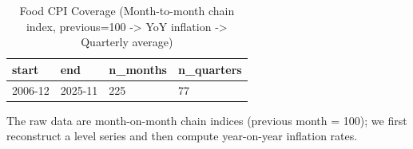 \begin{table}[!htbp]
    \centering
    \small
    \caption{Food CPI Coverage (Month-to-month chain index, previous=100 -> YoY inflation -> Quarterly average)}
    \label{tab:food_cpi_coverage}
    \begin{threeparttable}
        \begin{tabular}{@{}llll@{}}
            \toprule
            start   & end     & n_months & n_quarters \\
            \midrule
            2006-12 & 2025-11 & 225      & 77         \\
            \bottomrule
        \end{tabular}
        \begin{tablenotes}[flushleft]
            \footnotesize
            \item The raw data are month-on-month chain indices (previous month = 100); we first reconstruct a level series and then compute year-on-year inflation rates.
        \end{tablenotes}
    \end{threeparttable}
\end{table}
